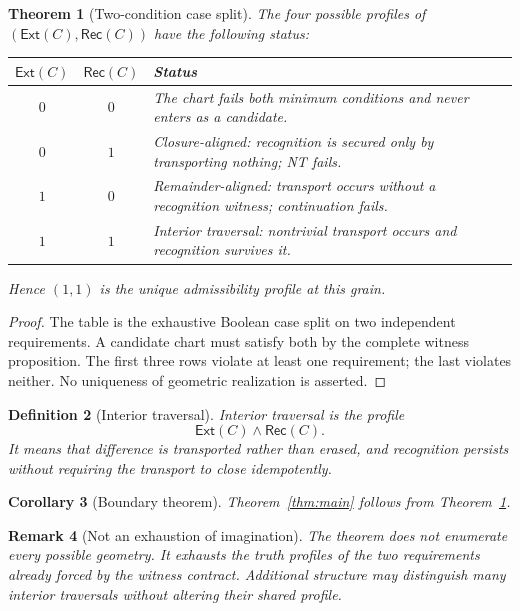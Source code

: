 \documentclass[11pt,letterpaper]{article}
\theoremstyle{constraintstyle}
\newtheorem{theorem}{Theorem}[section]
\newtheorem{corollary}[theorem]{Corollary}
\newtheorem{definition}[theorem]{Definition}
\newtheorem{remark}[theorem]{Remark}
\newcommand{\Ext}{\mathsf{Ext}}
\newcommand{\Rec}{\mathsf{Rec}}
\begin{document}
\begin{theorem}[Two-condition case split]\label{thm:cases}
The four possible profiles of $(\Ext(C),\Rec(C))$ have the following status:
\begin{center}
\begin{tabular}{c c p{}}
\toprule
$\Ext(C)$ & $\Rec(C)$ & Status \\
\midrule
$0$ & $0$ & The chart fails both minimum conditions and never enters as a candidate. \\
$0$ & $1$ & Closure-aligned: recognition is secured only by transporting nothing; NT fails. \\
$1$ & $0$ & Remainder-aligned: transport occurs without a recognition witness; continuation fails. \\
$1$ & $1$ & Interior traversal: nontrivial transport occurs and recognition survives it. \\
\bottomrule
\end{tabular}
\end{center}
Hence $(1,1)$ is the unique admissibility profile at this grain.
\end{theorem}

\begin{proof}
The table is the exhaustive Boolean case split on two independent requirements.  A candidate chart must satisfy both by the complete witness proposition.  The first three rows violate at least one requirement; the last violates neither.  No uniqueness of geometric realization is asserted.
\end{proof}

\begin{definition}[Interior traversal]
Interior traversal is the profile
\[
\Ext(C)\wedge\Rec(C).
\]
It means that difference is transported rather than erased, and recognition persists without requiring the transport to close idempotently.
\end{definition}

\begin{corollary}[Boundary theorem]
Theorem~\ref{thm:main} follows from Theorem~\ref{thm:cases}.
\end{corollary}

\begin{remark}[Not an exhaustion of imagination]
The theorem does not enumerate every possible geometry.  It exhausts the truth profiles of the two requirements already forced by the witness contract.  Additional structure may distinguish many interior traversals without altering their shared profile.
\end{remark}
\end{document}
